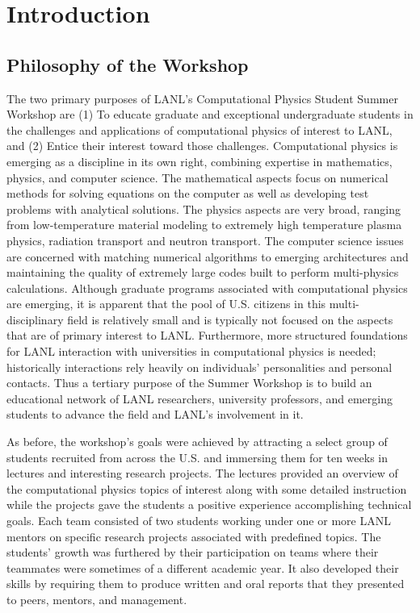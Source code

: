 \chapter{Introduction}

\section{Philosophy of the Workshop}

The two primary purposes of LANL's Computational Physics Student
Summer Workshop are (1) To educate graduate and exceptional
undergraduate students in the challenges and applications of
computational physics of interest to LANL, and (2) Entice their
interest toward those challenges. Computational physics is emerging as
a discipline in its own right, combining expertise in mathematics,
physics, and computer science. The mathematical aspects focus on
numerical methods for solving equations on the computer as well as
developing test problems with analytical solutions.  The physics
aspects are very broad, ranging from low-temperature material modeling
to extremely high temperature plasma physics, radiation transport and
neutron transport. The computer science issues are concerned with
matching numerical algorithms to emerging architectures and
maintaining the quality of extremely large codes built to perform
multi-physics calculations. Although graduate programs associated with
computational physics are emerging, it is apparent that the pool of
U.S. citizens in this multi-disciplinary field is relatively small and
is typically not focused on the aspects that are of primary interest
to LANL. Furthermore, more structured foundations for LANL interaction
with universities in computational physics is needed; historically
interactions rely heavily on individuals' personalities and personal
contacts. Thus a tertiary purpose of the Summer Workshop is to build
an educational network of LANL researchers, university professors, and
emerging students to advance the field and LANL's involvement in it.

As before, the
workshop's goals were achieved by attracting a select group of
students recruited from across the U.S. and immersing them for ten
weeks in lectures and interesting research projects.  The lectures
provided an overview of the computational physics topics of interest
along with some detailed instruction while the projects gave the
students a positive experience accomplishing technical goals. Each
team consisted of two students working under one or more LANL mentors
on specific research projects associated with predefined
topics. The students'
growth was furthered by their participation on teams where their
teammates were sometimes of a different academic year.  It also
developed their skills by requiring them to produce written and oral
reports that they presented to peers, mentors, and management.

